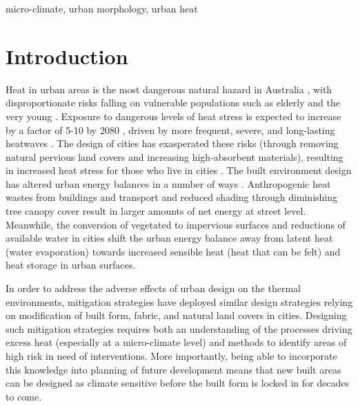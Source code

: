 \documentclass[final,3p,times,authoryear]{elsarticle}
\begin{document}
\begin{keyword}
micro-climate\sep 
urban morphology\sep
urban heat
\end{keyword}



\maketitle





\section{Introduction}
Heat in urban areas is the most dangerous natural hazard in Australia \citep{Coates2014}, with disproportionate risks falling on vulnerable populations such as elderly and the very young \citep{Nicholls2008}. Exposure to dangerous levels of heat stress is expected to increase by a factor of 5-10 by 2080 \citep{Coffel2018}, driven by more frequent, severe, and long-lasting heatwaves \citep{IPCC2013a}. The design of cities has exasperated these risks (through removing natural pervious land covers and increasing high-absorbent materials), resulting in increased heat stress for those who live in cities \citep{Coutts2012,Martilli2020}. The built environment design has altered urban energy balances in a number of ways \citep{Oke1982}. Anthropogenic heat wastes from buildings and transport and reduced shading through diminishing tree canopy cover result in larger amounts of net energy at street level. Meanwhile, the conversion of vegetated to impervious surfaces and reductions of available water in cities shift the urban energy balance away from latent heat (water evaporation) towards increased sensible heat (heat that can be felt) and heat storage in urban surfaces. 

In order to address the adverse effects of urban design on the thermal environments, mitigation strategies have deployed similar design strategies relying on modification of built form, fabric, and natural land covers in cities. Designing such mitigation strategies requires both an understanding of the processes driving excess heat (especially at a micro-climate level) and methods to identify areas of high risk in need of interventions. More importantly, being able to incorporate this knowledge into planning of future development means that new built areas can be designed as climate sensitive before the built form is locked in for decades to come. 
\end{document}
